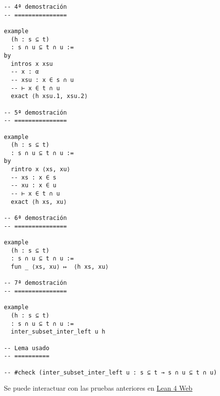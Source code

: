 \begin{verbatim}
-- 4ª demostración
-- ===============

example
  (h : s ⊆ t)
  : s ∩ u ⊆ t ∩ u :=
by
  intros x xsu
  -- x : α
  -- xsu : x ∈ s ∩ u
  -- ⊢ x ∈ t ∩ u
  exact ⟨h xsu.1, xsu.2⟩

-- 5ª demostración
-- ===============

example
  (h : s ⊆ t)
  : s ∩ u ⊆ t ∩ u :=
by
  rintro x ⟨xs, xu⟩
  -- xs : x ∈ s
  -- xu : x ∈ u
  -- ⊢ x ∈ t ∩ u
  exact ⟨h xs, xu⟩

-- 6ª demostración
-- ===============

example
  (h : s ⊆ t)
  : s ∩ u ⊆ t ∩ u :=
  fun _ ⟨xs, xu⟩ ↦  ⟨h xs, xu⟩

-- 7ª demostración
-- ===============

example
  (h : s ⊆ t)
  : s ∩ u ⊆ t ∩ u :=
  inter_subset_inter_left u h

-- Lema usado
-- ==========

-- #check (inter_subset_inter_left u : s ⊆ t → s ∩ u ⊆ t ∩ u)
\end{verbatim}
Se puede interactuar con las pruebas anteriores en \href{https://lean.math.hhu.de/\#url=https://raw.githubusercontent.com/jaalonso/Calculemus2/main/src/Propiedad\_de\_monotonia\_de\_la\_interseccion.lean}{Lean 4 Web}

